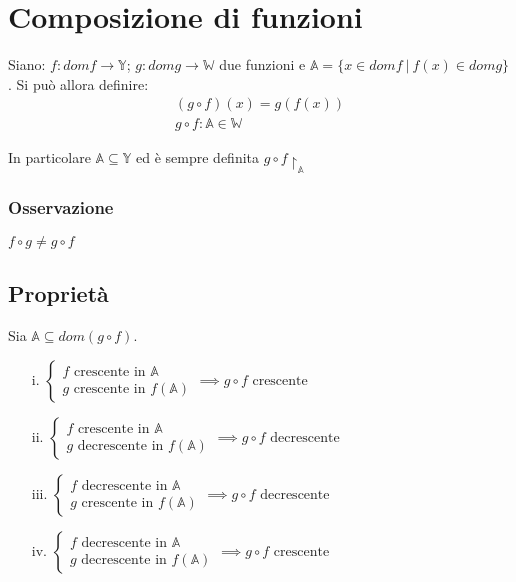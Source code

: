 \section{Composizione di funzioni}
Siano: $f: domf \rightarrow \mathbb{Y}$; $g: domg \rightarrow \mathbb{W}$ due funzioni e $\mathbb{A}=\{x \in domf\ |\ f(x) \in domg\}$. Si può allora definire:\\
\begin{equation}
\begin{gathered}
(g \circ f)(x) = g(f(x))\\
g \circ f: \mathbb{A} \in \mathbb{W}
\end{gathered}
\end{equation}

In particolare $\mathbb{A} \subseteq \mathbb{Y}$ ed è sempre definita $g \circ f \restriction _\mathbb{A}$
\subsubsection{Osservazione}
$f \circ g \neq g \circ f$

\subsection{Proprietà}
Sia $\mathbb{A} \subseteq dom(g \circ f)$.
\begin{enumerate}
\item[i.] $\begin{cases}
f \text{ crescente in } \mathbb{A}\\
g \text{ crescente in } f(\mathbb{A})
\end{cases} \implies g \circ f \text{ crescente}$
\item[ii.] $\begin{cases}
f \text{ crescente in } \mathbb{A}\\
g \text{ decrescente in } f(\mathbb{A})
\end{cases} \implies g \circ f \text{ decrescente}$
\item[iii.] $\begin{cases}
f \text{ decrescente in } \mathbb{A}\\
g \text{ crescente in } f(\mathbb{A})
\end{cases} \implies g \circ f \text{ decrescente}$
\item[iv.] $\begin{cases}
f \text{ decrescente in } \mathbb{A}\\
g \text{ decrescente in } f(\mathbb{A})
\end{cases} \implies g \circ f \text{ crescente}$
\end{enumerate} 

